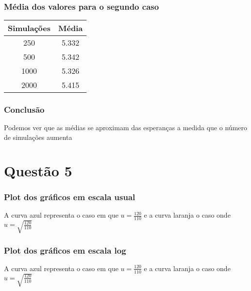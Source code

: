 \documentclass[
	11pt,				%
	openright,			%
	oneside,			%
	a4paper,			%
	english,			%
	french,				%
	spanish,			%
	brazil,				%
	]{abntex2}
\begin{document}
\subsection{Média dos valores para o segundo caso}
\begin{tabular}{cc}
\toprule
Simulações & Média\\
\midrule
250 & 5.332 \\
500  & 5.342 \\
1000 & 5.326 \\
2000 & 5.415
\end{tabular}

\subsection{Conclusão}
Podemos ver que as médias se aproximam das esperanças a medida que o número de simulações aumenta
\chapter{Questão 5}
\subsection{Plot dos gráficos em escala usual}
A curva azul representa o caso em que \(u = \frac{120}{110}\) e a curva laranja o caso onde \(u = \sqrt{\frac{120}{110}}\)

\begin{figure}[h]
\end{figure}
\newpage
\subsection{Plot dos gráficos em escala log}
A curva azul representa o caso em que \(u = \frac{120}{110}\) e a curva laranja o caso onde \(u = \sqrt{\frac{120}{110}}\)

\begin{figure}[h]
\end{figure}
\end{document}
